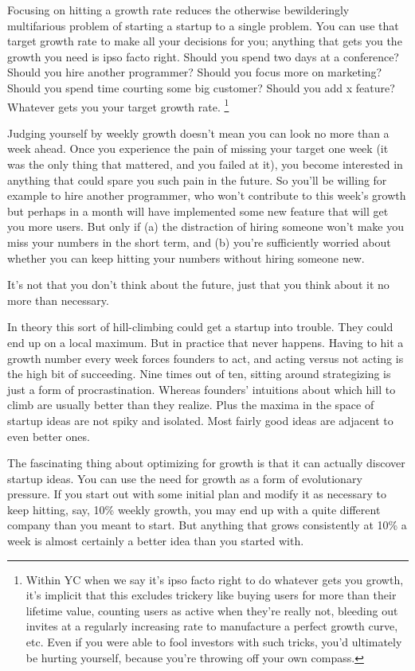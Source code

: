 Focusing on hitting a growth rate reduces the otherwise bewilderingly
multifarious problem of starting a startup to a single problem. You can
use that target growth rate to make all your decisions for you; anything
that gets you the growth you need is ipso facto right. Should you spend
two days at a conference? Should you hire another programmer? Should you
focus more on marketing? Should you spend time courting some big
customer? Should you add x feature? Whatever gets you your target growth
rate. \footnote{Within YC when we say it's ipso facto right to do whatever gets
you growth, it's implicit that this excludes trickery like buying users
for more than their lifetime value, counting users as active when
they're really not, bleeding out invites at a regularly increasing rate
to manufacture a perfect growth curve, etc. Even if you were able to
fool investors with such tricks, you'd ultimately be hurting yourself,
because you're throwing off your own compass.}

Judging yourself by weekly growth doesn't mean you can look no more than
a week ahead. Once you experience the pain of missing your target one
week (it was the only thing that mattered, and you failed at it), you
become interested in anything that could spare you such pain in the
future. So you'll be willing for example to hire another programmer, who
won't contribute to this week's growth but perhaps in a month will have
implemented some new feature that will get you more users. But only if
(a) the distraction of hiring someone won't make you miss your numbers
in the short term, and (b) you're sufficiently worried about whether you
can keep hitting your numbers without hiring someone new.

It's not that you don't think about the future, just that you think
about it no more than necessary.

In theory this sort of hill-climbing could get a startup into trouble.
They could end up on a local maximum. But in practice that never
happens. Having to hit a growth number every week forces founders to
act, and acting versus not acting is the high bit of succeeding. Nine
times out of ten, sitting around strategizing is just a form of
procrastination. Whereas founders' intuitions about which hill to climb
are usually better than they realize. Plus the maxima in the space of
startup ideas are not spiky and isolated. Most fairly good ideas are
adjacent to even better ones.

The fascinating thing about optimizing for growth is that it can
actually discover startup ideas. You can use the need for growth as a
form of evolutionary pressure. If you start out with some initial plan
and modify it as necessary to keep hitting, say, 10\% weekly growth, you
may end up with a quite different company than you meant to start. But
anything that grows consistently at 10\% a week is almost certainly a
better idea than you started with.

